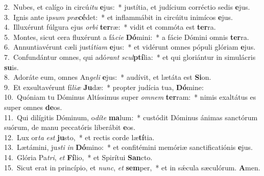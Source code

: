 {2.~}Nubes, et calígo in circú\textit{i}\textit{tu} \textbf{e}jus:~* justítia, et judícium corréctio sedis \textbf{e}jus.\\
{3.~}Ignis ante i\textit{psum} \textit{præ}\textbf{cé}det:~* et inflammábit in circúitu inimícos \textbf{e}jus.\\
{4.~}Illuxérunt fúlgura ejus \textit{or}\textit{bi} \textbf{ter}ræ:~* vidit et commóta est \textbf{ter}ra.\\
{5.~}Montes, sicut cera fluxérunt a fá\textit{ci}\textit{e} \textbf{Dó}mini:~* a fácie Dómini omnis \textbf{ter}ra.\\
{6.~}Annuntiavérunt cæli justí\textit{ti}\textit{am} \textbf{e}jus:~* et vidérunt omnes pópuli glóriam \textbf{e}jus.\\
{7.~}Confundántur omnes, qui adó\textit{rant} \textit{scul}\textbf{ptí}lia:~* et qui gloriántur in simulácris \textbf{su}is.\\
{8.~}Adoráte eum, omnes An\textit{ge}\textit{li} \textbf{e}jus:~* audívit, et lætáta est \textbf{Si}on.\\
{9.~}Et exsultavérunt fí\textit{li}\textit{æ} \textbf{Ju}dæ:~* propter judícia tua, \textbf{Dó}mine:\\
{10.~}Quóniam tu Dóminus Altíssimus super \textit{om}\textit{nem} \textbf{ter}ram:~* nimis exaltátus es super omnes \textbf{de}os.\\
{11.~}Qui dilígitis Dóminum, o\textit{dí}\textit{te} \textbf{ma}lum:~* custódit Dóminus ánimas sanctórum suórum, de manu peccatóris liberábit \textbf{e}os.\\
{12.~}Lux or\textit{ta} \textit{est} \textbf{ju}sto,~* et rectis corde læ\textbf{tí}tia.\\
{13.~}Lætámini, ju\textit{sti} \textit{in} \textbf{Dó}mino:~* et confitémini memóriæ sanctificatiónis \textbf{e}jus.\\
{14.~}Glória Pa\textit{tri}, \textit{et} \textbf{Fí}lio,~* et Spirítui \textbf{San}cto.\\
{15.~}Sicut erat in princípio, et \textit{nunc}, \textit{et} \textbf{sem}per,~* et in sǽcula sæculórum. \textbf{A}men.\\
